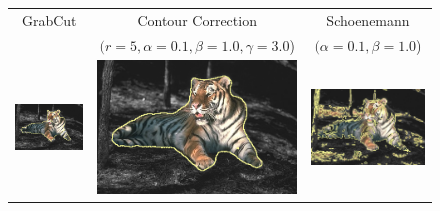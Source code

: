 \documentclass[smallextended]{svjour3}       %
\begin{document}
{{\begin{figure}[ht!]
	\center
	\begin{tabular}{ccc}
		GrabCut & Contour Correction & Schoenemann \\
		& $(r=5, \alpha=0.1, \beta=1.0, \gamma=3.0$) & $(\alpha=0.1, \beta=1.0$)\\
		\includegraphics[scale=0.2]{images/segmentation/bc/tiger1/gc-seg.png} &
		\includegraphics[scale=0.2]{images/segmentation/bc/tiger1/corrected-seg.png} &					\includegraphics[scale=0.2]{images/segmentation/schoenemann/tiger1/tiger1-seg.png}\\									

\end{tabular}
\end{figure}}}
\end{document}
